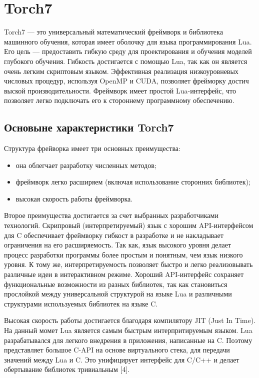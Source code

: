 \documentclass[a4paper,english,russian]{G2-105}
\begin{document}
\section{Torch7}
\par Torch7 --- это универсальный математический фреймворк и библиотека машинного обучения, которая имеет оболочку для языка программирования Lua. Его цель --- предоставить гибкую среду для проектирования и обучения моделей глубокого обучения. Гибкость достигается с помощью Lua, так как он является очень легким скриптовым языком. Эффективная реализация низкоуровневых числовых процедур, используя OpenMP и CUDA, позволяет фрейморку достич выской производительности. Фреймворк имеет простой Lua-интерфейс, что позволяет легко подключать его к стороннему программному обеспечению.
\ttl
\subsection{Основыне характеристики Torch7}
\par Структура фрейворка имеет три основных преимущества:
\begin{itemize}
\item она облегчает разработку численных методов;
\item фреймворк легко расширяем (включая использование сторонних библиотек);
\item высокая скорость работы фреймворка.
\end{itemize}
\par Второе преимущества достигается за счет выбранных разработчиками технологий. Скрипровый (интерпретируемый) язык с хорошим API-интерфейсом для C обеспечивает фреймворку гибкост в разработке и не накладывает ограничения на его расширяемость. Так как, язык высокого уровня делает процесс разработки программы более простым и понятным, чем язык низкого уровня. К тому же, интерпретируемость позволяет быстро и легко реализовывать различные идеи в интерактивном режиме. Хороший API-интерфейс сохраняет функциональные возможности из разных библиотек, так как становиться прослойкой между универсальной структурой на языке Lua и различными структурами используемых библиотек на языке C.
\par Высокая скорость работы достигается благодаря компилятору JIT (Just In Time). На данный момет Lua является самым быстрым интерпритируемым языком. Lua разрабатывался для легкого внедрения в приложения, написанные на C. Поэтому представляет большое C-API на основе виртуального стека, для передачи значений между Lua и C. Это унифицирует интерфейс для C/C++ и делает обертывание библиотек тривиальным [4].
\end{document}
